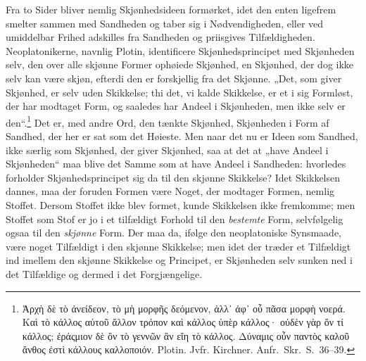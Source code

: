 \documentclass[12pt]{book}
\newcommand{\opage}[1]{\marginnote{\footnotesize\textit{[#1]}}}
\begin{document}
Fra to Sider bliver nemlig Skjønhedsideen formørket, idet den enten ligefrem smelter sammen med Sandheden og taber sig i Nødvendigheden, eller ved umiddelbar Frihed adskilles fra Sandheden og priisgives Tilfældigheden. Neoplatonikerne, navnlig Plotin, identificere Skjønhedsprincipet med Skjønheden selv, den over alle skjønne Former ophøiede Skjønhed, en Skjønhed, der dog ikke selv kan være skjøn, efterdi den er forskjellig fra det Skjønne. „Det, som giver Skjønhed, er selv uden Skikkelse; thi det, vi kalde Skikkelse, er et i sig Formløst, der har modtaget Form, og saaledes har Andeel i Skjønheden, men ikke selv er den“.\footnote{Ἀρχὴ δὲ τὸ ἀνείδεον, τὸ μὴ μορφῆς δεόμενον, ἀλλ᾽ ἀφ᾽ οὗ πᾶσα μορφὴ νοερά. Καὶ τὸ κάλλος αὐτοῦ ἄλλον τρόπον καὶ κάλλος ὑπὲρ κάλλος· οὐδὲν γὰρ ὂν τί κάλλος; ἐράςμιον δὲ %
ὂν τὸ γεννῶν ἂν εἴη τὸ κάλλος. Δύναμις οὖν παντὸς καλοῦ ἄνθος ἐστὶ κάλλους καλλοποιόν. Plotin. Jvfr. Kirchner. Anfr.\ Skr.\ S.~36--39.}%
 Det er, med
\opage{377}andre Ord, den tænkte Skjønhed, Skjønheden i Form af Sandhed, der her er sat som det Høieste. Men naar det nu er Ideen som Sandhed, ikke særlig som Skjønhed, der giver Skjønhed, saa at det at „have Andeel i Skjønheden“ maa blive det Samme som at have Andeel i Sandheden: hvorledes forholder Skjønhedsprincipet sig da til den skjønne Skikkelse? Idet Skikkelsen dannes, maa der foruden Formen være Noget, der modtager Formen, nemlig Stoffet. Dersom Stoffet ikke blev formet, kunde Skikkelsen ikke fremkomme; men Stoffet som Stof er jo i et tilfældigt Forhold til den \emph{bestemte} Form, selvfølgelig ogsaa til den \emph{skjønne} Form. Der maa da, ifølge den neoplatoniske Synsmaade, være noget Tilfældigt i den skjønne Skikkelse; men idet der træder et Tilfældigt ind imellem den skjønne Skikkelse og Principet, er Skjønheden selv sunken ned i det Tilfældige og dermed i det Forgjængelige.
\end{document}
